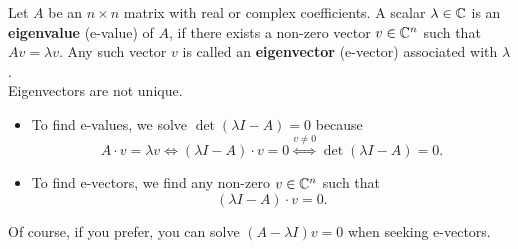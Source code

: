     
\begin{tcolorbox}[title=\textbf{Permanent Definition of Eigenvalues and Eigenvectors}]
 Let $A$ be an $n\times n$ matrix with real or complex coefficients. A scalar $\lambda \in  \mathbb C$ is an \textbf{eigenvalue} (e-value) of $A$, if there exists a non-zero vector $v \in \mathbb C^{n}$ such that $Av=\lambda v$. Any such vector $v$ is called an \textbf{eigenvector} (e-vector) associated with $\lambda$. \\
 
 Eigenvectors are not unique.\\
 
 \begin{itemize}
\item To find e-values, we solve $\det(\lambda I - A)=0$ because
    \begin{equation}
        A \cdot v=\lambda v \iff(\lambda I-A)\cdot v=0 \overset{v\neq 0}{\iff} \det(\lambda I-A)=0.
    \end{equation}
\item To find e-vectors, we find any non-zero $v\in \mathbb C^n$ such that 
\begin{equation}
\label{eq:EvectorDef}
    (\lambda I-A)\cdot v=0.
\end{equation}
\end{itemize}
Of course, if you prefer, you can solve $(A - \lambda I)v=0$ when seeking e-vectors.
\end{tcolorbox}

